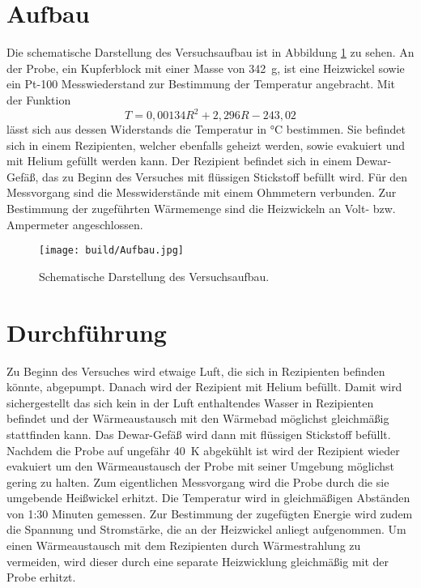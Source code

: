 \section{Aufbau}
\label{sec:Aufbau}

Die schematische Darstellung des Versuchsaufbau ist in Abbildung \ref{fig:aufbau} zu sehen. An der Probe, ein Kupferblock mit einer Masse von \SI{342}{\gram},  ist eine Heizwickel sowie ein Pt-100 Messwiederstand zur Bestimmung der Temperatur angebracht.
Mit der Funktion
\begin{equation}
	T = 0,00134 R^2 + 2,296 R -243,02
	\label{eq:pt100}
\end{equation}
lässt sich aus dessen Widerstands die Temperatur in °C bestimmen.
 Sie befindet sich in einem Rezipienten, welcher ebenfalls geheizt werden, sowie evakuiert und mit Helium gefüllt werden kann. Der Rezipient befindet sich in einem Dewar-Gefäß, das zu Beginn des Versuches mit flüssigen Stickstoff befüllt wird. Für den Messvorgang sind die Messwiderstände mit einem Ohmmetern verbunden.
Zur Bestimmung der zugeführten Wärmemenge sind die Heizwickeln an Volt- bzw. Ampermeter angeschlossen.

\begin{figure}
  \centering
  \texttt{[image: build/Aufbau.jpg]}
  \caption{Schematische Darstellung des Versuchsaufbau.\cite{Anleitung}}
  \label{fig:aufbau}
\end{figure}


\section{Durchführung}

Zu Beginn des Versuches wird etwaige Luft, die sich in Rezipienten befinden könnte, abgepumpt. Danach wird der Rezipient mit Helium befüllt. Damit wird sichergestellt das sich kein in der Luft enthaltendes Wasser in Rezipienten befindet und der Wärmeaustausch mit den Wärmebad möglichst gleichmäßig stattfinden kann. Das Dewar-Gefäß wird dann mit flüssigen Stickstoff befüllt. Nachdem die Probe auf ungefähr \SI{40}{\K} abgekühlt ist wird der Rezipient wieder evakuiert um den Wärmeaustausch der Probe mit seiner Umgebung möglichst gering zu halten.
Zum eigentlichen Messvorgang wird die Probe durch die sie umgebende Heißwickel erhitzt. Die Temperatur wird in gleichmäßigen Abständen von 1:30 Minuten gemessen. Zur Bestimmung der zugefügten Energie wird zudem die Spannung und Stromstärke, die an der Heizwickel anliegt aufgenommen. Um einen Wärmeaustausch mit dem Rezipienten durch Wärmestrahlung zu vermeiden, wird dieser durch eine separate Heizwicklung gleichmäßig mit der Probe erhitzt. 
